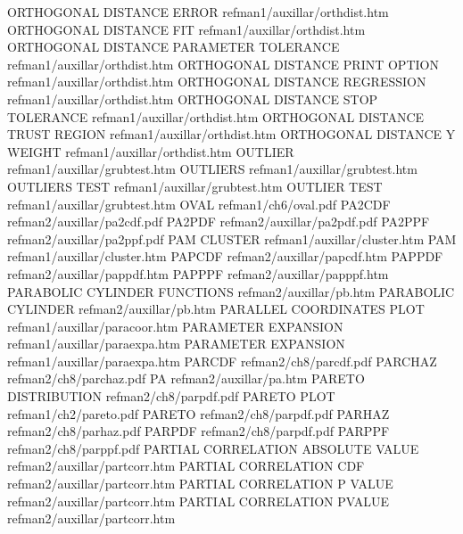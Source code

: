 ORTHOGONAL DISTANCE ERROR               refman1/auxillar/orthdist.htm
ORTHOGONAL DISTANCE FIT                 refman1/auxillar/orthdist.htm
ORTHOGONAL DISTANCE PARAMETER TOLERANCE refman1/auxillar/orthdist.htm
ORTHOGONAL DISTANCE PRINT OPTION        refman1/auxillar/orthdist.htm
ORTHOGONAL DISTANCE REGRESSION          refman1/auxillar/orthdist.htm
ORTHOGONAL DISTANCE STOP TOLERANCE      refman1/auxillar/orthdist.htm
ORTHOGONAL DISTANCE TRUST REGION        refman1/auxillar/orthdist.htm
ORTHOGONAL DISTANCE Y WEIGHT            refman1/auxillar/orthdist.htm
OUTLIER                                 refman1/auxillar/grubtest.htm
OUTLIERS                                refman1/auxillar/grubtest.htm
OUTLIERS TEST                           refman1/auxillar/grubtest.htm
OUTLIER TEST                            refman1/auxillar/grubtest.htm
OVAL                                    refman1/ch6/oval.pdf
PA2CDF                                  refman2/auxillar/pa2cdf.pdf
PA2PDF                                  refman2/auxillar/pa2pdf.pdf
PA2PPF                                  refman2/auxillar/pa2ppf.pdf
PAM CLUSTER                             refman1/auxillar/cluster.htm
PAM                                     refman1/auxillar/cluster.htm
PAPCDF                                  refman2/auxillar/papcdf.htm
PAPPDF                                  refman2/auxillar/pappdf.htm
PAPPPF                                  refman2/auxillar/papppf.htm
PARABOLIC CYLINDER FUNCTIONS            refman2/auxillar/pb.htm
PARABOLIC CYLINDER                      refman2/auxillar/pb.htm
PARALLEL COORDINATES PLOT               refman1/auxillar/paracoor.htm
PARAMETER EXPANSION                     refman1/auxillar/paraexpa.htm
PARAMETER EXPANSION                     refman1/auxillar/paraexpa.htm
PARCDF                                  refman2/ch8/parcdf.pdf
PARCHAZ                                 refman2/ch8/parchaz.pdf
PA                                      refman2/auxillar/pa.htm
PARETO DISTRIBUTION                     refman2/ch8/parpdf.pdf
PARETO PLOT                             refman1/ch2/pareto.pdf
PARETO                                  refman2/ch8/parpdf.pdf
PARHAZ                                  refman2/ch8/parhaz.pdf
PARPDF                                  refman2/ch8/parpdf.pdf
PARPPF                                  refman2/ch8/parppf.pdf
PARTIAL CORRELATION ABSOLUTE VALUE      refman2/auxillar/partcorr.htm
PARTIAL CORRELATION CDF                 refman2/auxillar/partcorr.htm
PARTIAL CORRELATION P VALUE             refman2/auxillar/partcorr.htm
PARTIAL CORRELATION PVALUE              refman2/auxillar/partcorr.htm
